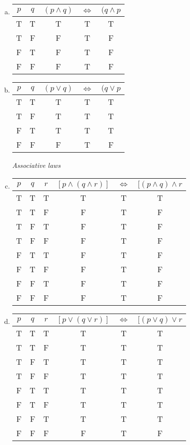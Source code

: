 \documentclass[12pt]{scrartcl} %
\begin{document}
\begin{enumerate}[(a)]
	\item \begin{tabular}{*{2}{c}|*{3}{c}}$p$&$q$&$(p \land q)$&$\iff$&$(q \land p$\\
\hline
T&T&T&T&T\\
T&F&F&T&F\\
F&T&F&T&F\\
F&F&F&T&F\\	
\end{tabular}

	\item \begin{tabular}{*{2}{c}|*{3}{c}}$p$&$q$&$(p \lor q)$&$\iff$&$(q \lor p$\\
\hline
T&T&T&T&T\\
T&F&T&T&T\\
F&T&T&T&T\\
F&F&F&T&F\\
\end{tabular}

\emph{Associative laws}
	\item \begin{tabular}{*{3}{c}|*{3}{c}}$p$&$q$&$r$&$[p \land (q \land r)]$&$\iff$&$[(p \land q) \land r$\\
\hline
T&T&T&T&T&T\\
T&T&F&F&T&F\\
T&F&T&F&T&F\\
T&F&F&F&T&F\\
F&T&T&F&T&F\\
F&T&F&F&T&F\\
F&F&T&F&T&F\\
F&F&F&F&T&F\\
\end{tabular}

	\item \begin{tabular}{*{3}{c}|*{3}{c}}$p$&$q$&$r$&$[p \lor (q \lor r)]$&$\iff$&$[(p \lor q) \lor r$\\
\hline
T&T&T&T&T&T\\
T&T&F&T&T&T\\
T&F&T&T&T&T\\
T&F&F&T&T&T\\
F&T&T&T&T&T\\
F&T&F&T&T&T\\
F&F&T&T&T&T\\
F&F&F&F&T&F\\
\end{tabular}


\end{enumerate}
\end{document}
